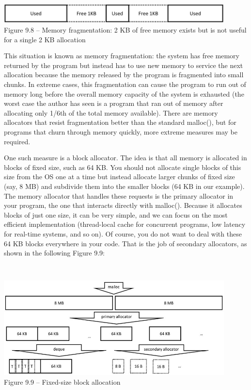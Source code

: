 \hspace*{\fill} \\ %
\begin{center}
\includegraphics[width=0.9\textwidth]{content/3/chapter9/images/8.jpg}\\
Figure 9.8 – Memory fragmentation: 2 KB of free memory exists but is not useful for a single 2 KB allocation
\end{center}

This situation is known as memory fragmentation: the system has free memory returned by the program but instead has to use new memory to service the next allocation because the memory released by the program is fragmented into small chunks. In extreme cases, this fragmentation can cause the program to run out of memory long before the overall memory capacity of the system is exhausted (the worst case the author has seen is a program that ran out of memory after allocating only 1/6th of the total memory available). There are memory allocators that resist fragmentation better than the standard malloc(), but for programs that churn through memory quickly, more extreme measures may be required.

One such measure is a block allocator. The idea is that all memory is allocated in blocks of fixed size, such as 64 KB. You should not allocate single blocks of this size from the OS one at a time but instead allocate larger chunks of fixed size (say, 8 MB) and subdivide them into the smaller blocks (64 KB in our example). The memory allocator that handles these requests is the primary allocator in your program, the one that interacts directly with malloc(). Because it allocates blocks of just one size, it can be very simple, and we can focus on the most efficient implementation (thread-local cache for concurrent programs, low latency for real-time systems, and so on). Of course, you do not want to deal with these 64 KB blocks everywhere in your code. That is the job of secondary allocators, as shown in the following Figure 9.9:

\hspace*{\fill} \\ %
\begin{center}
\includegraphics[width=0.9\textwidth]{content/3/chapter9/images/9.jpg}\\
Figure 9.9 – Fixed-size block allocation
\end{center}

